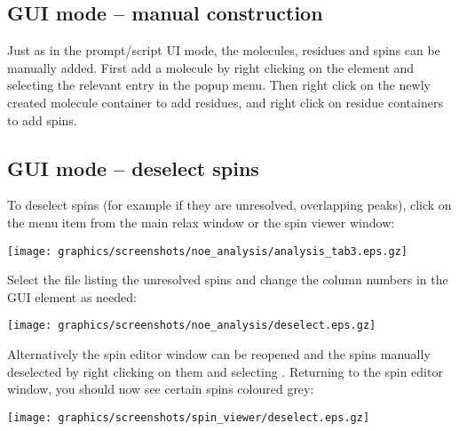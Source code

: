 
\subsection{GUI mode -- manual construction} \label{sect: GUI - manual construction}

Just as in the prompt/script UI mode, the molecules, residues and spins can be manually added.  First add a molecule by right clicking on the  element and selecting the relevant entry in the popup menu.  Then right click on the newly created molecule container to add residues, and right click on residue containers to add spins.



\subsection{GUI mode -- deselect spins} \label{sect: GUI - deselect spins}

To deselect spins (for example if they are unresolved, overlapping peaks), click on the  menu item from the main relax window or the spin viewer window:

\begin{minipage}[h]{\linewidth}
\centerline{\texttt{[image: graphics/screenshots/noe\_analysis/analysis\_tab3.eps.gz]}}
\end{minipage}

Select the file listing the unresolved spins and change the column numbers in the  GUI element as needed: 

\begin{minipage}[h]{\linewidth}
\centerline{\texttt{[image: graphics/screenshots/noe\_analysis/deselect.eps.gz]}}
\end{minipage}

Alternatively the spin editor window can be reopened and the spins manually deselected by right clicking on them and selecting .  Returning to the spin editor window, you should now see certain spins coloured grey:

\begin{minipage}[h]{\linewidth}
\centerline{\texttt{[image: graphics/screenshots/spin\_viewer/deselect.eps.gz]}}
\end{minipage}



